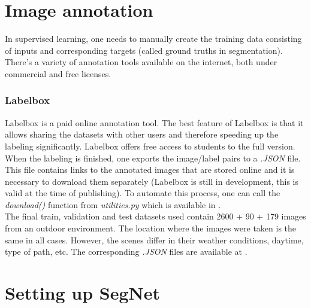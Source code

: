 \newpage
\section{Image annotation}

In supervised learning, one needs to manually create the training data consisting of inputs and corresponding targets (called ground truths in segmentation). There's a variety of annotation tools available on the internet, both under commercial and free licenses. 

\subsubsection{Labelbox}

Labelbox \cite{labelbox} is a paid online annotation tool. The best feature of Labelbox is that it allows sharing the datasets with other users and therefore speeding up the labeling significantly. Labelbox offers free access to students to the full version. When the labeling is finished, one exports the image/label pairs to a \textit{.JSON} file. This file contains links to the annotated images that are stored online and it is necessary to download them separately (Labelbox is still in development, this is valid at the time of publishing). To automate this process, one can call the \textit{download()} function from \textit{utilities.py} which is available in \cite{filip_github}. \\

The final train, validation and test datasets used contain 2600 + 90 + 179 images from an outdoor environment. The location where the images were taken is the same in all cases. However, the scenes differ in their weather conditions, daytime, type of path, etc. The corresponding \textit{.JSON} files are available at \cite{filip_github}.



\newpage
\section{Setting up SegNet}

